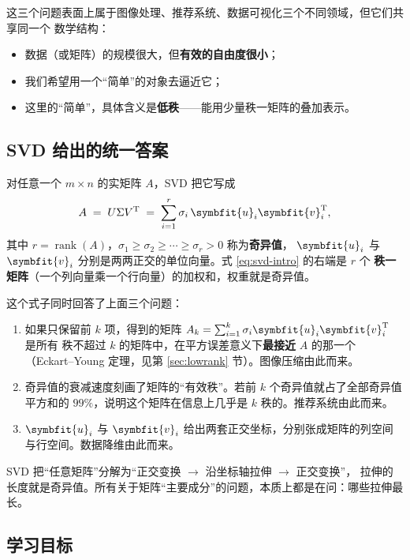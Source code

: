 \documentclass[UTF8, 11pt, a4paper, fontset=windows]{ctexart}
\theoremstyle{cnthm}
\theoremstyle{cndef}
\newcommand{\T}{^{\mathrm{T}}}
\DeclareMathOperator{\rank}{rank}
\newcommand{\bu}{\symbfit{u}}
\newcommand{\vv}{\symbfit{v}}
\begin{document}
这三个问题表面上属于图像处理、推荐系统、数据可视化三个不同领域，但它们共享同一个
数学结构：

\begin{itemize}
  \item 数据（或矩阵）的规模很大，但\textbf{有效的自由度很小}；
  \item 我们希望用一个“简单”的对象去逼近它；
  \item 这里的“简单”，具体含义是\textbf{低秩}——能用少量秩一矩阵的叠加表示。
\end{itemize}

\subsection{SVD 给出的统一答案}

对任意一个 $m\times n$ 的实矩阵 $A$，SVD 把它写成
\begin{equation}\label{eq:svd-intro}
  A \;=\; U\Sigma V\T \;=\; \sum_{i=1}^{r}\sigma_i\,\bu_i\vv_i\T ,
\end{equation}
其中 $r=\rank(A)$，$\sigma_1\ge\sigma_2\ge\cdots\ge\sigma_r>0$ 称为\textbf{奇异值}，
$\bu_i$ 与 $\vv_i$ 分别是两两正交的单位向量。式 \eqref{eq:svd-intro} 的右端是 $r$ 个
\textbf{秩一矩阵}（一个列向量乘一个行向量）的加权和，权重就是奇异值。

这个式子同时回答了上面三个问题：

\begin{enumerate}
  \item 如果只保留前 $k$ 项，得到的矩阵 $A_k=\sum_{i=1}^{k}\sigma_i\bu_i\vv_i\T$ 是所有
        秩不超过 $k$ 的矩阵中，在平方误差意义下\textbf{最接近} $A$ 的那一个
        （Eckart--Young 定理，见第 \ref{sec:lowrank} 节）。图像压缩由此而来。
  \item 奇异值的衰减速度刻画了矩阵的“有效秩”。若前 $k$ 个奇异值就占了全部奇异值平方和的
        $99\%$，说明这个矩阵在信息上几乎是 $k$ 秩的。推荐系统由此而来。
  \item $\bu_i$ 与 $\vv_i$ 给出两套正交坐标，分别张成矩阵的列空间与行空间。数据降维由此而来。
\end{enumerate}

\begin{keybox}[一句话概括]
SVD 把“任意矩阵”分解为“正交变换 $\to$ 沿坐标轴拉伸 $\to$ 正交变换”，
拉伸的长度就是奇异值。所有关于矩阵“主要成分”的问题，本质上都是在问：哪些拉伸最长。
\end{keybox}

\subsection{学习目标}
\end{document}
